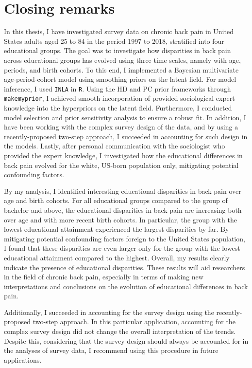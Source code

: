 \section{Closing remarks}
\label{section:application2:conclusion}
In this thesis, I have investigated survey data on chronic back pain in United States adults aged 25 to 84 in the period 1997 to 2018, stratified into four educational groups. The goal was to investigate how disparities in back pain across educational groups has evolved using three time scales, namely with age, periods, and birth cohorts. To this end, I implemented a Bayesian multivariate age-period-cohort model using smoothing priors on the latent field. For model inference, I used \texttt{INLA} in \texttt{R}. Using the HD and PC prior frameworks through \texttt{makemyprior}, I achieved smooth incorporation of provided sociological expert knowledge into the hyperpriors on the latent field. Furthermore, I conducted model selection and prior sensitivity analysis to ensure a robust fit. In addition, I have been working with the complex survey design of the data, and by using a recently-proposed two-step approach, I succeeded in accounting for such design in the models. Lastly, after personal communication with the sociologist who provided the expert knowledge, I investigated how the educational differences in back pain evolved for the white, US-born population only, mitigating potential confounding factors.

By my analysis, I identified interesting educational disparities in back pain over age and birth cohorts. For all educational groups compared to the group of bachelor and above, the educational disparities in back pain are increasing both over age and with more recent birth cohorts. In particular, the group with the lowest educational attainment experienced the largest disparities by far. By mitigating potential confounding factors foreign to the United States population, I found that these disparities are even larger only for the group with the lowest educational attainment compared to the highest. Overall, my results clearly indicate the presence of educational disparities. These results will aid researchers in the field of chronic back pain, especially in terms of making new interpretations and conclusions on the evolution of educational differences in back pain. 

Additionally, I succeeded in accounting for the survey design using the recently-proposed two-step approach. In this particular application, accounting for the complex survey design did not change the overall interpretation of the trends. Despite this, considering that the survey design should always be accounted for in the analyses of survey data, I recommend using this procedure in future applications. 

